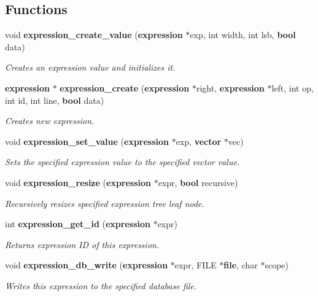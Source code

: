 \subsection*{Functions}
\begin{CompactItemize}
\item 
void {\bf expression\_\-create\_\-value} ({\bf expression} $\ast$exp, int width, int lsb, {\bf bool} data)
\begin{CompactList}\small\item\em Creates an expression value and initializes it. \item\end{CompactList}\item 
{\bf expression} $\ast$ {\bf expression\_\-create} ({\bf expression} $\ast$right, {\bf expression} $\ast$left, int op, int id, int line, {\bf bool} data)
\begin{CompactList}\small\item\em Creates new expression. \item\end{CompactList}\item 
void {\bf expression\_\-set\_\-value} ({\bf expression} $\ast$exp, {\bf vector} $\ast$vec)
\begin{CompactList}\small\item\em Sets the specified expression value to the specified vector value. \item\end{CompactList}\item 
void {\bf expression\_\-resize} ({\bf expression} $\ast$expr, {\bf bool} recursive)
\begin{CompactList}\small\item\em Recursively resizes specified expression tree leaf node. \item\end{CompactList}\item 
int {\bf expression\_\-get\_\-id} ({\bf expression} $\ast$expr)
\begin{CompactList}\small\item\em Returns expression ID of this expression. \item\end{CompactList}\item 
void {\bf expression\_\-db\_\-write} ({\bf expression} $\ast$expr, FILE $\ast${\bf file}, char $\ast$scope)
\begin{CompactList}\small\item\em Writes this expression to the specified database file. \item\end{CompactList}\item 

\end{CompactItemize}
